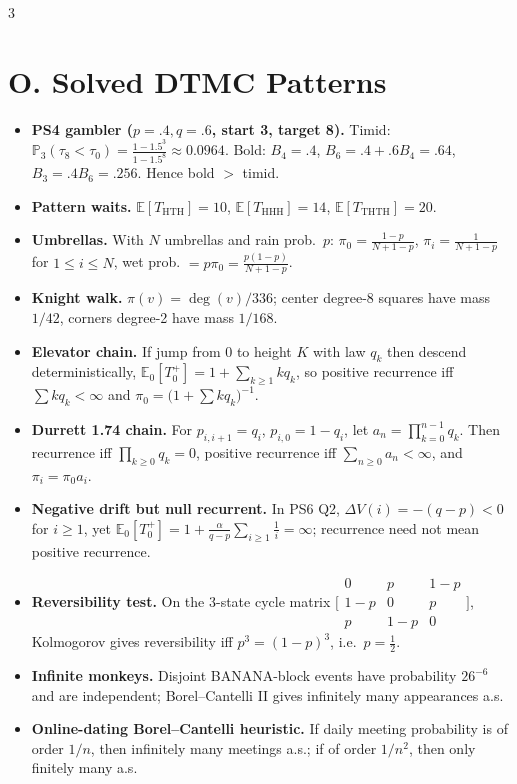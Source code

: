 \documentclass[8pt]{extarticle}
\newcommand{\PP}{\mathbb{P}}
\newcommand{\E}{\mathbb{E}}
\newcommand{\1}{\mathbf{1}}
\begin{document}
\begin{multicols*}{3}
\section*{O. Solved DTMC Patterns}
\begin{itemize}
\item \textbf{PS4 gambler ($p=.4,q=.6$, start 3, target 8).} Timid:
$\PP_3(\tau_8<\tau_0)=\frac{1-1.5^3}{1-1.5^8}\approx0.0964$. Bold: $B_4=.4$, $B_6=.4+.6B_4=.64$, $B_3=.4B_6=.256$. Hence bold $>$ timid.
\item \textbf{Pattern waits.} $\E[T_{\mathrm{HTH}}]=10$, $\E[T_{\mathrm{HHH}}]=14$, $\E[T_{\mathrm{THTH}}]=20$.
\item \textbf{Umbrellas.} With $N$ umbrellas and rain prob.\ $p$:
$\pi_0=\frac{1-p}{N+1-p}$, $\pi_i=\frac1{N+1-p}$ for $1\le i\le N$, wet prob. $=p\pi_0=\frac{p(1-p)}{N+1-p}$.
\item \textbf{Knight walk.} $\pi(v)=\deg(v)/336$; center degree-8 squares have mass $1/42$, corners degree-2 have mass $1/168$.
\item \textbf{Elevator chain.} If jump from $0$ to height $K$ with law $q_k$ then descend deterministically, $\E_0[T_0^+]=1+\sum_{k\ge1}kq_k$, so positive recurrence iff $\sum kq_k<\infty$ and $\pi_0=\bigl(1+\sum kq_k\bigr)^{-1}$.
\item \textbf{Durrett 1.74 chain.} For $p_{i,i+1}=q_i$, $p_{i,0}=1-q_i$, let $a_n=\prod_{k=0}^{n-1}q_k$. Then recurrence iff $\prod_{k\ge0}q_k=0$, positive recurrence iff $\sum_{n\ge0}a_n<\infty$, and $\pi_i=\pi_0a_i$.
\item \textbf{Negative drift but null recurrent.} In PS6 Q2, $\Delta V(i)=-(q-p)<0$ for $i\ge1$, yet $\E_0[T_0^+]=1+\frac{\alpha}{q-p}\sum_{i\ge1}\frac1i=\infty$; recurrence need not mean positive recurrence.
\item \textbf{Reversibility test.} On the 3-state cycle matrix $\bigl[\begin{smallmatrix}0&p&1-p\\1-p&0&p\\p&1-p&0\end{smallmatrix}\bigr]$, Kolmogorov gives reversibility iff $p^3=(1-p)^3$, i.e.\ $p=\frac12$.
\item \textbf{Infinite monkeys.} Disjoint BANANA-block events have probability $26^{-6}$ and are independent; Borel--Cantelli II gives infinitely many appearances a.s.
\item \textbf{Online-dating Borel--Cantelli heuristic.} If daily meeting probability is of order $1/n$, then infinitely many meetings a.s.; if of order $1/n^2$, then only finitely many a.s.
\end{itemize}


\end{multicols*}
\end{document}
